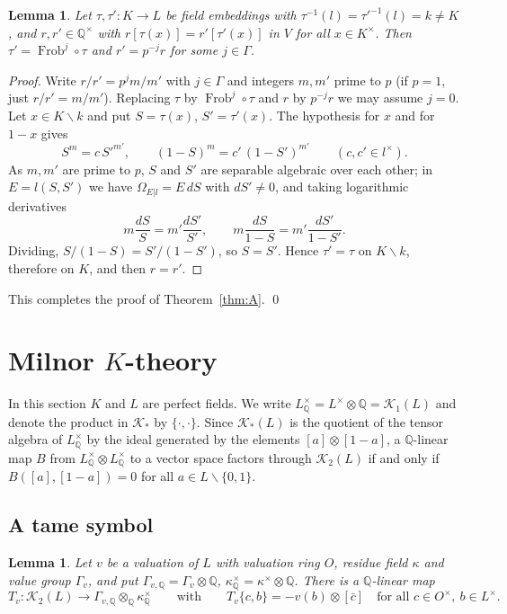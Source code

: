 \documentclass[11pt]{amsart}
\newtheorem{lemma}[theorem]{Lemma}
\theoremstyle{definition}
\theoremstyle{remark}
\newcommand{\QQ}{\mathbb{Q}}
\newcommand{\Frob}{\operatorname{Frob}}
\newcommand{\sm}{\smallsetminus}
\newcommand{\Kr}{\mathcal{K}}
\begin{document}
\begin{lemma}\label{lem:unique}
Let $\tau,\tau'\colon K\to L$ be field embeddings with $\tau^{-1}(l)=\tau'^{-1}(l)=k\neq K$, and $r,r'\in\QQ^\times$ with $r[\tau(x)]=r'[\tau'(x)]$ in $V$ for all $x\in K^\times$.
Then $\tau'=\Frob^j\circ\tau$ and $r'=p^{-j}r$ for some $j\in\Gamma$.
\end{lemma}

\begin{proof}
Write $r/r'=p^{j}m/m'$ with $j\in\Gamma$ and integers $m,m'$ prime to $p$ (if $p=1$, just $r/r'=m/m'$). Replacing $\tau$ by $\Frob^j\circ\tau$ and $r$ by $p^{-j}r$ we may assume $j=0$.
Let $x\in K\sm k$ and put $S=\tau(x)$, $S'=\tau'(x)$. The hypothesis for $x$ and for $1-x$ gives
\[ S^m=c\,S'^{m'},\qquad (1-S)^m=c'\,(1-S')^{m'}\qquad(c,c'\in l^\times). \]
As $m,m'$ are prime to $p$, $S$ and $S'$ are separable algebraic over each other; in $E=l(S,S')$ we have $\Omega_{E|l}=E\,dS$ with $dS'\ne0$, and taking logarithmic derivatives
\[ m\frac{dS}{S}=m'\frac{dS'}{S'},\qquad m\frac{dS}{1-S}=m'\frac{dS'}{1-S'} . \]
Dividing, $S/(1-S)=S'/(1-S')$, so $S=S'$. Hence $\tau'=\tau$ on $K\sm k$, therefore on $K$, and then $r=r'$.
\end{proof}

This completes the proof of Theorem~\ref{thm:A}. \qed


\section{Milnor \texorpdfstring{$K$}{K}-theory}\label{sec:K}

In this section $K$ and $L$ are perfect fields. We write $L^\times_\QQ=L^\times\otimes\QQ=\Kr_1(L)$ and denote the product in $\Kr_*$ by $\{\cdot,\cdot\}$.
Since $\Kr_*(L)$ is the quotient of the tensor algebra of $L^\times_\QQ$ by the ideal generated by the elements $[a]\otimes[1-a]$, a $\QQ$-linear map $B$ from $L^\times_\QQ\otimes L^\times_\QQ$ to a vector space factors through $\Kr_2(L)$ if and only if
$B([a],[1-a])=0$ for all $a\in L\sm\{0,1\}$.

\subsection{A tame symbol}

\begin{lemma}\label{lem:tame}
Let $v$ be a valuation of $L$ with valuation ring $O$, residue field $\kappa$ and value group $\Gamma_v$, and put $\Gamma_{v,\QQ}=\Gamma_v\otimes\QQ$, $\kappa^\times_\QQ=\kappa^\times\otimes\QQ$.
There is a $\QQ$-linear map
\[ T_v\colon\Kr_2(L)\to\Gamma_{v,\QQ}\otimes_\QQ\kappa^\times_\QQ\qquad\text{with}\qquad T_v\{c,b\}=-v(b)\otimes[\bar c]\quad\text{for all }c\in O^\times,\ b\in L^\times . \]
\end{lemma}
\end{document}
